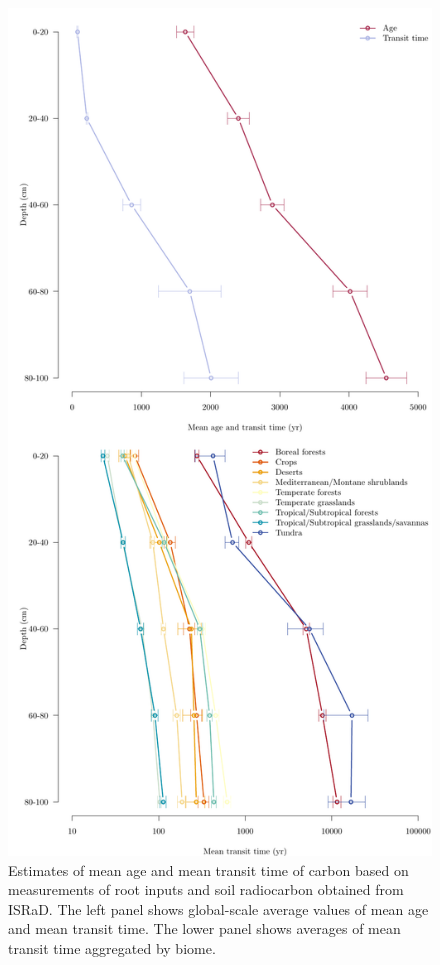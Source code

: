 \documentclass[11pt, oneside, a4paper]{article}   	%
\begin{document}
\begin{figure}[htbp]
   \centering
   \includegraphics[scale=0.65]{Figures/biomeTT.pdf} %
   \caption{Estimates of mean age and mean transit time of carbon based on measurements of root inputs and soil radiocarbon obtained from ISRaD. The left panel shows global-scale average values of mean age and mean transit time. The lower panel shows averages of mean transit time aggregated by biome.}
   \label{fig:AgeTTprofiles}
\end{figure}
\end{document}
